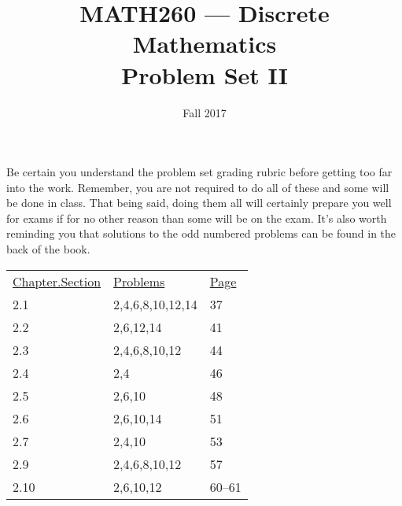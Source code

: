\documentclass[nobib]{tufte-handout}
\title{MATH260 --- Discrete Mathematics \\  Problem Set II}
\date{Fall 2017}
\begin{document}
\maketitle

Be certain you understand the problem set grading rubric before getting too far into the work.  Remember, you are not required to do all of these and some will be done in class. That being said, doing them all will certainly prepare you well for exams if for no other reason than some will be on the exam. It's also worth reminding you that solutions to the odd numbered problems can be found in the back of the book.

\vspace{.25in}
\begin{tabular}{lll}
\underline{Chapter.Section} & \underline{Problems} & \underline{Page} \\
2.1 & 2,4,6,8,10,12,14 & 37  \\
2.2 & 2,6,12,14 & 41 \\
2.3 & 2,4,6,8,10,12 & 44 \\
2.4 & 2,4 & 46 \\
2.5 & 2,6,10 & 48 \\
2.6 & 2,6,10,14 & 51 \\
2.7 & 2,4,10 & 53 \\
2.9 & 2,4,6,8,10,12 & 57 \\
2.10 & 2,6,10,12 & 60--61
\end{tabular}
\end{document}
